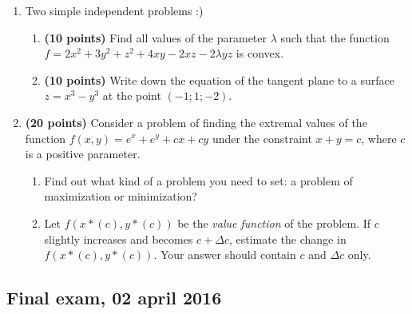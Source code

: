 \documentclass[12pt]{article} %
\theoremstyle{definition} %
\begin{document}
\begin{enumerate}[resume]

\item Two simple independent problems :)
\begin{enumerate}
\item \textbf{(10 points) }Find all values of the parameter $\lambda $ such that the function $f=2x^{2} +3y^{2} +z^{2} +4xy-2xz-2\lambda yz$ is convex.

\item \textbf{(10 points) }Write down the equation of the tangent plane to a surface $z=x^{3} -y^{3} $ at the point $(-1;1;-2)$.
\end{enumerate}

\item \textbf{(20 points) }Consider a problem of finding the extremal values of the function $f(x,y)=e^{x} +e^{y} +cx+cy$ under the constraint $x+y=c$, where $c$ is a positive parameter.

\begin{enumerate}
\item  Find out what kind of a problem you need to set: a problem of maximization or minimization?

\item Let $f(x*(c),y*(c))$ be the \textit{value function} of the problem. If $c$ slightly increases and becomes $c+\Delta c$, estimate the change in $f(x*(c),y*(c))$. Your answer should contain $c$ and $\Delta c$ only.
\end{enumerate}

\end{enumerate}


\subsection{Final exam, 02 april 2016}
\end{document}
